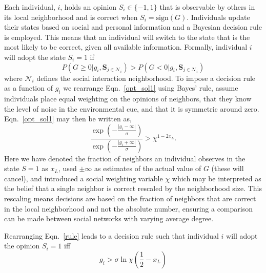 \documentclass[3p,number,sort&compress,times]{elsarticle}
\begin{document}
Each individual, $i$, holds an opinion $S_i \in \{ -1,1\}$ that is observable by others in its local neighborhood and is correct when $S_i = \mbox{sign}(G)$. Individuals update their states based on social and personal information and a Bayesian decision rule \cite{nitzan1982optimal,perez2011collective, Perreault, torney2015} is employed. This means that an individual will switch to the state that is the most likely to be correct, given all available information. Formally, individual $i$ will adopt the state $S_i=1$ if
\begin{equation}
 P\left(G \ge 0\big| g_i, \mathbf{S}_{j\in \mathcal{N}_i}\right)  > P\left(G < 0\big| g_i, \mathbf{S}_{j\in \mathcal{N}_i}\right)
\label{opt_sol1}
\end{equation}
where $\mathcal{N}_i$ defines the social interaction neighborhood. To impose a decision rule as a function of $g_i$ we rearrange Eqn.~\ref{opt_sol1} using Bayes' rule, assume individuals place equal weighting on the opinions of neighbors, that they know the level of noise in the environmental cue, and that it is symmetric around zero. Eqn.~\ref{opt_sol1} may then be written as,
\begin{equation}
\frac{\exp{ \left( - \frac{\vert g_i -  \infty \vert}{\sigma} \right)}}{\exp{ \left( - \frac{\vert g_i + \infty \vert}{\sigma} \right)}} > \chi^{1-2x_L}.
\label{rule}
\end{equation}
Here we have denoted the fraction of neighbors an individual observes in the state $S=1$ as $x_L$, used $\pm \infty$ as estimates of the actual value of $G$ (these will cancel), and introduced a social weighting variable $\chi$ which may be interpreted as the belief that a single neighbor is correct rescaled by the neighborhood size. This rescaling means decisions are based on the fraction of neighbors that are correct in the local neighborhood and not the absolute number, ensuring a comparison can be made between social networks with varying average degree.

Rearranging Eqn.~\ref{rule} leads to a decision rule such that individual $i$ will adopt the opinion $S_i = 1$ iff
\begin{equation}
g_i >  \sigma\ln\chi  \left(\frac{1}{2}-x_L\right) 
\label{opt_rule}
\end{equation}


\end{document}
